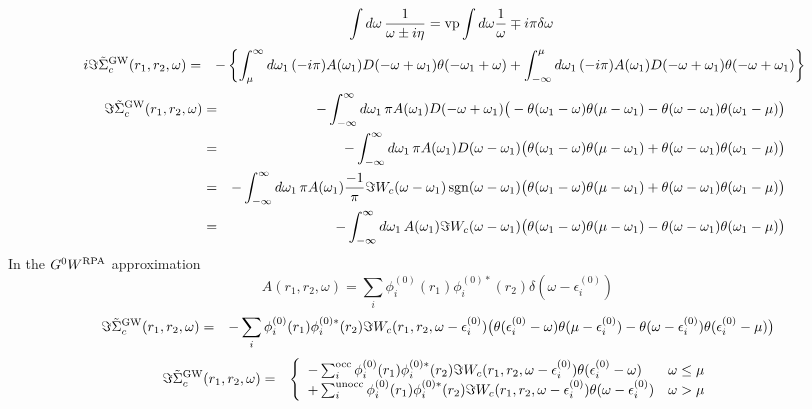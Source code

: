 \documentclass[fleqn]{article}
\begin{document}
\[
  \qquad
    \int d\omega \, \frac{1}{\omega \pm i\eta} = {\rm vp} \int d\omega \frac{1}{\omega} \mp i \pi \delta{\omega}
\]
\begin{eqnarray*}
  \quad
  i \Im \tilde{\Sigma}^{\rm GW}_c(r_1,r_2,\omega) &=& - \left\{
  \int^{\infty}_{\mu} d\omega_1 \, (-i \pi) A(\omega_1) D(-\omega+\omega_1) \theta(-\omega_1+\omega) +
  \int^\mu_{-\infty} d\omega_1 \, (-i \pi) A(\omega_1) D(-\omega+\omega_1) \theta(-\omega+\omega_1) \right\}
\end{eqnarray*}
\begin{eqnarray*}
  \quad
  \Im \tilde{\Sigma}^{\rm GW}_c(r_1,r_2,\omega) &=& -
  \int_{-\infty}^\infty d\omega_1 \, \pi A(\omega_1) D(-\omega+\omega_1) 
  \big( 
  -\theta(\omega_1-\omega) \theta(\mu-\omega_1) - \theta(\omega-\omega_1) \theta(\omega_1-\mu)
  \big)
  \\ &=& -
  \int_{-\infty}^\infty d\omega_1 \, \pi A(\omega_1) D(\omega-\omega_1) 
  \big( 
  \theta(\omega_1-\omega) \theta(\mu-\omega_1) + \theta(\omega-\omega_1) \theta(\omega_1-\mu)
  \big)
  \\ &=&
  - \int_{-\infty}^\infty d\omega_1 \, \pi A(\omega_1) 
  \frac{-1}{\pi} \Im W_c(\omega-\omega_1) \mathrm{\, sgn}(\omega-\omega_1)
  \big( 
  \theta(\omega_1-\omega) \theta(\mu-\omega_1) + \theta(\omega-\omega_1) \theta(\omega_1-\mu)
  \big)
  \\ &=&
  - \int_{-\infty}^\infty d\omega_1 \, A(\omega_1) \Im W_c(\omega-\omega_1)
  \big( 
  \theta(\omega_1-\omega) \theta(\mu-\omega_1) - \theta(\omega-\omega_1) \theta(\omega_1-\mu)
  \big)
\end{eqnarray*}
In the $G^0W^{\rm RPA}$ approximation
\[
  A(r_1,r_2,\omega) = \sum_i \phi_i^{(0)}(r_1) \phi_i^{(0)*}(r_2) \delta(\omega-\epsilon_i^{(0)})
\]
\begin{eqnarray*}
  \Im \tilde{\Sigma}^{\rm GW}_c(r_1,r_2,\omega) &=&
  - \sum_i \phi_i^{(0)}(r_1) \phi_i^{(0)*}(r_2) \Im W_c(r_1,r_2,\omega-\epsilon_i^{(0)})
  \big( \theta(\epsilon_i^{(0)}-\omega) \theta(\mu-\epsilon_i^{(0)}) 
  - \theta(\omega-\epsilon_i^{(0)}) \theta(\epsilon_i^{(0)}-\mu) \big)
\end{eqnarray*}
\begin{eqnarray*}
  \Im \tilde{\Sigma}^{\rm GW}_c(r_1,r_2,\omega) &=&
  \left\{ \begin{array}{ll}
  - \sum_i^{\rm occ} \phi_i^{(0)}(r_1) \phi_i^{(0)*}(r_2) \Im W_c(r_1,r_2,\omega-\epsilon_i^{(0)}) 
  \theta(\epsilon_i^{(0)}-\omega) & \omega \le \mu \\
  + \sum_i^{\rm unocc} \phi_i^{(0)}(r_1) \phi_i^{(0)*}(r_2) \Im W_c(r_1,r_2,\omega-\epsilon_i^{(0)}) 
  \theta(\omega-\epsilon_i^{(0)}) & \omega > \mu
  \end{array} \right.
\end{eqnarray*}
\end{document}

